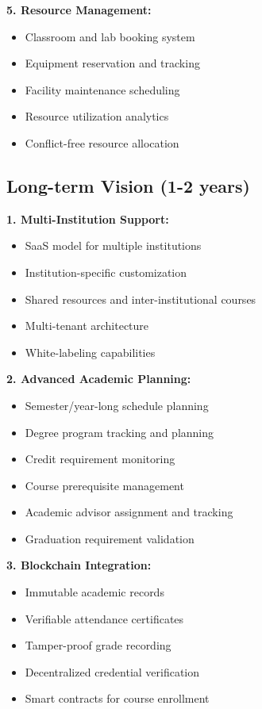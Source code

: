 \textbf{5. Resource Management:}
\begin{itemize}
    \item Classroom and lab booking system
    \item Equipment reservation and tracking
    \item Facility maintenance scheduling
    \item Resource utilization analytics
    \item Conflict-free resource allocation
\end{itemize}

\subsection{Long-term Vision (1-2 years)}

\textbf{1. Multi-Institution Support:}
\begin{itemize}
    \item SaaS model for multiple institutions
    \item Institution-specific customization
    \item Shared resources and inter-institutional courses
    \item Multi-tenant architecture
    \item White-labeling capabilities
\end{itemize}

\textbf{2. Advanced Academic Planning:}
\begin{itemize}
    \item Semester/year-long schedule planning
    \item Degree program tracking and planning
    \item Credit requirement monitoring
    \item Course prerequisite management
    \item Academic advisor assignment and tracking
    \item Graduation requirement validation
\end{itemize}

\textbf{3. Blockchain Integration:}
\begin{itemize}
    \item Immutable academic records
    \item Verifiable attendance certificates
    \item Tamper-proof grade recording
    \item Decentralized credential verification
    \item Smart contracts for course enrollment
\end{itemize}


